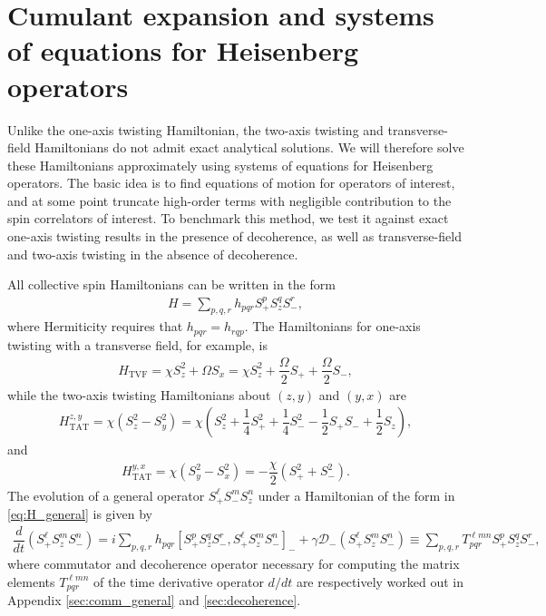 \documentclass[aps,notitlepage,nofootinbib,11pt]{revtex4-1}
\renewcommand{\t}{\text} %
\newcommand{\f}[2]{\dfrac{#1}{#2}} %
\newcommand{\p}[1]{\left(#1\right)} %
\renewcommand{\sp}[1]{\left[#1\right]} %
\newcommand{\D}{\mathcal{D}}
\newcommand{\1}{\mathds{1}}
\begin{document}
\section{Cumulant expansion and systems of equations for Heisenberg
  operators}

Unlike the one-axis twisting Hamiltonian, the two-axis twisting and
transverse-field Hamiltonians do not admit exact analytical
solutions. We will therefore solve these Hamiltonians approximately
using systems of equations for Heisenberg operators.  The basic idea
is to find equations of motion for operators of interest, and at some
point truncate high-order terms with negligible contribution to the
spin correlators of interest.  To benchmark this method, we test it
against exact one-axis twisting results in the presence of
decoherence, as well as transverse-field and two-axis twisting in the
absence of decoherence.

All collective spin Hamiltonians can be written in the form
\begin{align}
  H = \sum_{p,q,r} h_{pqr} S_+^p S_z^q S_-^r,
  \label{eq:H_general}
\end{align}
where Hermiticity requires that $h_{pqr}=h_{rqp}$.  The Hamiltonians
for one-axis twisting with a transverse field, for example, is
\begin{align}
  H_{\t{TVF}}
  = \chi S_z^2 + \Omega S_x
  = \chi S_z^2 + \f{\Omega}{2} S_+ + \f{\Omega}{2} S_-,
\end{align}
while the two-axis twisting Hamiltonians about $\p{z,y}$ and $\p{y,x}$
are
\begin{align}
  H_{\t{TAT}}^{z,y}
  = \chi \p{S_z^2 - S_y^2}
  = \chi \p{S_z^2 + \f14 S_+^2 + \f14 S_-^2 - \f12 S_+ S_- + \f12 S_z},
\end{align}
and
\begin{align}
  H_{\t{TAT}}^{y,x}
  = \chi\p{S_y^2 - S_x^2}
  = -\f{\chi}{2} \p{S_+^2 + S_-^2}.
\end{align}
The evolution of a general operator $S_+^\ell S_-^m S_z^n$ under a
Hamiltonian of the form in \eqref{eq:H_general} is given by
\begin{align}
  \f{d}{dt} \p{S_+^\ell S_z^m S_-^n}
  = i\sum_{p,q,r} h_{pqr} \sp{S_+^p S_z^q S_-^r, S_+^\ell S_z^m S_-^n}_-
  + \gamma \D_-\p{S_+^\ell S_z^m S_-^n}
  \equiv \sum_{p,q,r} T^{\ell m n}_{pqr} S_+^p S_z^q S_-^r,
  \label{eq:time_derivative}
\end{align}
where commutator and decoherence operator necessary for computing the
matrix elements $T^{\ell m n}_{pqr}$ of the time derivative operator
$d/dt$ are respectively worked out in Appendix \ref{sec:comm_general}
and \ref{sec:decoherence}.
\end{document}
